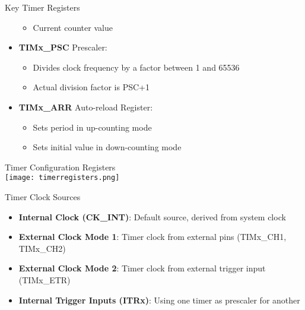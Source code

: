 \begin{corollary}{Key Timer Registers}
\begin{minipage}{0.5\linewidth}
\begin{itemize}
    \begin{itemize}
        \item Current counter value
    \end{itemize}
    \item \textbf{TIMx\_PSC} Prescaler:
    \begin{itemize}
        \item Divides clock frequency by a factor between 1 and 65536
        \item Actual division factor is PSC+1
    \end{itemize}
    \item \textbf{TIMx\_ARR} Auto-reload Register:
    \begin{itemize}
        \item Sets period in up-counting mode
        \item Sets initial value in down-counting mode
    \end{itemize}
\end{itemize}
\end{minipage}
\end{corollary}

\begin{concept}{Timer Configuration Registers}\\
\texttt{[image: timerregisters.png]}
\end{concept}


\begin{theorem}{Timer Clock Sources}
\begin{itemize}
    \item \textbf{Internal Clock (CK\_INT)}: Default source, derived from system clock
    \item \textbf{External Clock Mode 1}: Timer clock from external pins (TIMx\_CH1, TIMx\_CH2)
    \item \textbf{External Clock Mode 2}: Timer clock from external trigger input (TIMx\_ETR)
    \item \textbf{Internal Trigger Inputs (ITRx)}: Using one timer as prescaler for another
\end{itemize}
\end{theorem}

